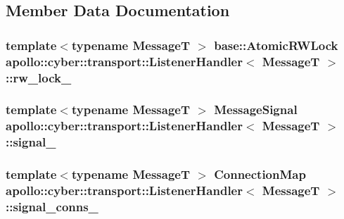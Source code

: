 \subsection{Member Data Documentation}
\hypertarget{classapollo_1_1cyber_1_1transport_1_1ListenerHandler_adc3e16ad07f7ae7fd46fcd905880f216}{
\subsubsection[{rw\-\_\-lock\-\_\-}]{\setlength{\rightskip}{0pt plus 5cm}template$<$typename Message\-T $>$ {\bf base\-::\-Atomic\-R\-W\-Lock} {\bf apollo\-::cyber\-::transport\-::\-Listener\-Handler}$<$ Message\-T $>$\-::rw\-\_\-lock\-\_\-\hspace{0.3cm}{\ttfamily [private]}}}\label{classapollo_1_1cyber_1_1transport_1_1ListenerHandler_adc3e16ad07f7ae7fd46fcd905880f216}
\hypertarget{classapollo_1_1cyber_1_1transport_1_1ListenerHandler_ac43fe4e3f5d7bbd16f21606f19cb349e}{
\subsubsection[{signal\-\_\-}]{\setlength{\rightskip}{0pt plus 5cm}template$<$typename Message\-T $>$ {\bf Message\-Signal} {\bf apollo\-::cyber\-::transport\-::\-Listener\-Handler}$<$ Message\-T $>$\-::signal\-\_\-\hspace{0.3cm}{\ttfamily [private]}}}\label{classapollo_1_1cyber_1_1transport_1_1ListenerHandler_ac43fe4e3f5d7bbd16f21606f19cb349e}
\hypertarget{classapollo_1_1cyber_1_1transport_1_1ListenerHandler_a305d0d57ad20695d87607abc21d50d37}{
\subsubsection[{signal\-\_\-conns\-\_\-}]{\setlength{\rightskip}{0pt plus 5cm}template$<$typename Message\-T $>$ {\bf Connection\-Map} {\bf apollo\-::cyber\-::transport\-::\-Listener\-Handler}$<$ Message\-T $>$\-::signal\-\_\-conns\-\_\-\hspace{0.3cm}{\ttfamily [private]}}}\label{classapollo_1_1cyber_1_1transport_1_1ListenerHandler_a305d0d57ad20695d87607abc21d50d37}
